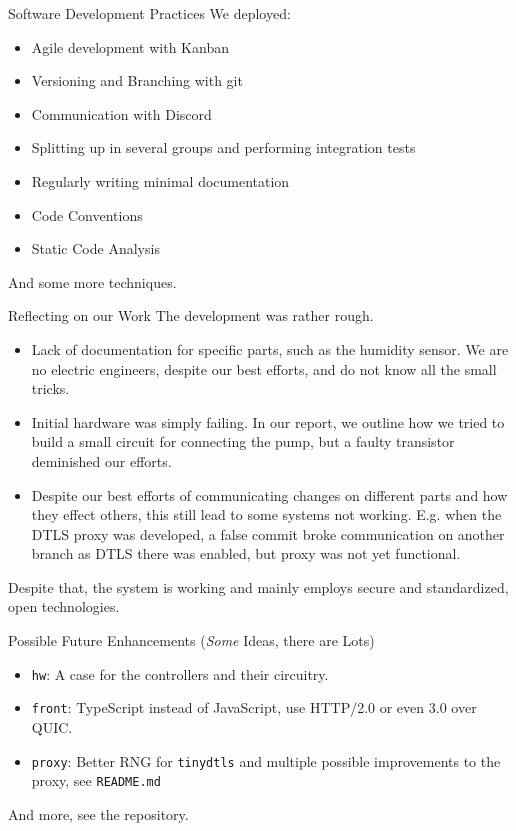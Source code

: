 \documentclass[10pt, xcolor=svgnames]{beamer}
\begin{document}
\begin{frame}{Software Development Practices}
    We deployed:
    \begin{itemize}
        \item Agile development with Kanban
        \item Versioning and Branching with git
        \item Communication with Discord
        \item Splitting up in several groups and performing integration tests
        \item Regularly writing minimal documentation
        \item Code Conventions
        \item Static Code Analysis
    \end{itemize}
    And some more techniques.
\end{frame}

\begin{frame}{Reflecting on our Work}
    The development was rather rough.
    \begin{itemize}
        \item Lack of documentation for specific parts, such as the humidity sensor. We are no electric engineers, despite our best efforts, and do not know all the small tricks.
        \item Initial hardware was simply failing. In our report, we outline how we tried to build a small circuit for connecting the pump, but a faulty transistor deminished our efforts.
        \item Despite our best efforts of communicating changes on different parts and how they effect others, this still lead to some systems not working. E.g. when the DTLS proxy was developed, a false commit broke communication on another branch as DTLS there was enabled, but proxy was not yet functional.
    \end{itemize}

    Despite that, the system is working and mainly employs secure and standardized, open technologies.
\end{frame}

\begin{frame}{Possible Future Enhancements (\emph{Some} Ideas, there are Lots)}
    \begin{itemize}
        \item \texttt{hw}: A case for the controllers and their circuitry.
        \item \texttt{front}: TypeScript instead of JavaScript, use HTTP/2.0 or even 3.0 over QUIC.
        \item \texttt{proxy}: Better RNG for \texttt{tinydtls} and multiple possible improvements to the proxy, see \texttt{README.md}
    \end{itemize}

    And more, see the repository.
\end{frame}
\end{document}
